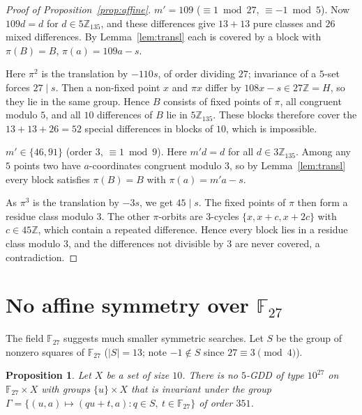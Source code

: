 \documentclass[11pt]{article}
\newtheorem{proposition}[theorem]{Proposition}
\theoremstyle{remark}
\newcommand{\Z}{\mathbb{Z}}
\newcommand{\F}{\mathbb{F}}
\begin{document}
\begin{proof}[Proof of Proposition~\ref{prop:affine}]
\smallskip\noindent\emph{$m'=109$} ($\equiv1 \bmod 27$, $\equiv-1\bmod 5$).  Now $109d=d$ for
$d\in5\Z_{135}$, and these differences give $13+13$ pure classes and $26$ mixed differences.  By
Lemma~\ref{lem:transl} each is covered by a block with $\pi(B)=B$, $\pi(a)=109a-s$.

Here $\pi^2$ is the translation by $-110s$, of order dividing $27$; invariance of a $5$-set forces
$27\mid s$.  Then a non-fixed point $x$ and $\pi x$ differ by $108x-s\in 27\Z=H$, so they lie in the same
group.  Hence $B$ consists of fixed points of $\pi$, all congruent modulo $5$, and all $10$ differences
of $B$ lie in $5\Z_{135}$.  These blocks therefore cover the $13+13+26=52$ special differences in
blocks of $10$, which is impossible.

\smallskip\noindent\emph{$m'\in\{46,91\}$} (order $3$, $\equiv1\bmod 9$).  Here $m'd=d$ for all
$d\in3\Z_{135}$.  Among any $5$ points two have $a$-coordinates congruent modulo $3$, so by
Lemma~\ref{lem:transl} every block satisfies $\pi(B)=B$ with $\pi(a)=m'a-s$.

As $\pi^3$ is the translation by $-3s$, we get $45\mid s$.  The fixed points of $\pi$ then form a
residue class modulo $3$.  The other $\pi$-orbits are $3$-cycles $\{x,x+c,x+2c\}$ with $c\in45\Z$,
which contain a repeated difference.  Hence every block lies in a residue class modulo $3$, and the
differences not divisible by $3$ are never covered, a contradiction.
\end{proof}

\section{\texorpdfstring{No affine symmetry over $\F_{27}$}{No affine symmetry over F27}}\label{sec:F27}

The field $\F_{27}$ suggests much smaller symmetric searches.  Let $S$ be the group of nonzero squares
of $\F_{27}$ ($|S|=13$; note $-1\notin S$ since $27\equiv3\pmod 4$).

\begin{proposition}\label{prop:agl}
Let $X$ be a set of size $10$.  There is no $5$-GDD of type $10^{27}$ on $\F_{27}\times X$ with groups
$\{u\}\times X$ that is invariant under the group
$\Gamma=\{(u,a)\mapsto(qu+t,a): q\in S,\ t\in\F_{27}\}$ of order $351$.
\end{proposition}
\end{document}
